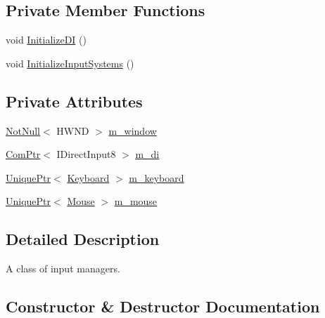 \subsection*{Private Member Functions}
\begin{DoxyCompactItemize}
\item 
void \mbox{\hyperlink{classmage_1_1input_1_1_manager_1_1_impl_a407de000dcb4df8fa32a09e246150daf}{Initialize\+DI}} ()
\item 
void \mbox{\hyperlink{classmage_1_1input_1_1_manager_1_1_impl_af97f784f50a39c43ed41abe207a8f61e}{Initialize\+Input\+Systems}} ()
\end{DoxyCompactItemize}
\subsection*{Private Attributes}
\begin{DoxyCompactItemize}
\item 
\mbox{\hyperlink{namespacemage_a8769f9d670d6b585ea306cb1062af94b}{Not\+Null}}$<$ H\+W\+ND $>$ \mbox{\hyperlink{classmage_1_1input_1_1_manager_1_1_impl_afd49b4b35e1c1f93084d5cf31b89fe80}{m\+\_\+window}}
\item 
\mbox{\hyperlink{namespacemage_ae74f374780900893caa5555d1031fd79}{Com\+Ptr}}$<$ I\+Direct\+Input8 $>$ \mbox{\hyperlink{classmage_1_1input_1_1_manager_1_1_impl_afa76fc86c9bc75ac5c00414bc3d03fdb}{m\+\_\+di}}
\item 
\mbox{\hyperlink{namespacemage_a3316d7143a973e37adf1110f2e80ca31}{Unique\+Ptr}}$<$ \mbox{\hyperlink{classmage_1_1input_1_1_keyboard}{Keyboard}} $>$ \mbox{\hyperlink{classmage_1_1input_1_1_manager_1_1_impl_a2b41f999b73742a6c3cb7ba9e86aee9e}{m\+\_\+keyboard}}
\item 
\mbox{\hyperlink{namespacemage_a3316d7143a973e37adf1110f2e80ca31}{Unique\+Ptr}}$<$ \mbox{\hyperlink{classmage_1_1input_1_1_mouse}{Mouse}} $>$ \mbox{\hyperlink{classmage_1_1input_1_1_manager_1_1_impl_aeae8977636864dddcbcdb69ecefca133}{m\+\_\+mouse}}
\end{DoxyCompactItemize}


\subsection{Detailed Description}
A class of input managers. 

\subsection{Constructor \& Destructor Documentation}
\mbox{\label{classmage_1_1input_1_1_manager_1_1_impl_ac0bc834732b5870792d1b6557e9bbaf7}} 
